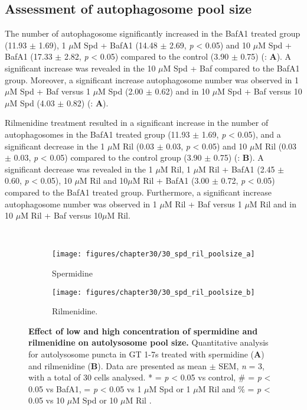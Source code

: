 {\subsection{Assessment of autophagosome pool size}
The number of autophagosome significantly increased in the BafA1 treated group (11.93  $\pm$ 1.69), 1 $\mu$M Spd + BafA1 (14.48 $\pm$ 2.69, \textit{p} < 0.05) and 10 $\mu$M Spd + BafA1 (17.33 $\pm$ 2.82, \textit{p} < 0.05) compared to the control (3.90 $\pm$ 0.75) (: \textbf{A}). A significant increase was revealed in the 10 $\mu$M Spd + Baf compared to the BafA1 group. Moreover, a significant increase autophagosome number was observed in 1 $\mu$M Spd + Baf versus 1 $\mu$M Spd (2.00 $\pm$ 0.62) and in 10 $\mu$M Spd + Baf versus 10 $\mu$M Spd (4.03 $\pm$ 0.82) (: \textbf{A}).

Rilmenidine treatment resulted in a significant increase in the number of autophagosomes in the BafA1 treated group (11.93 $\pm$ 1.69, \textit{p} < 0.05), and a significant decrease in the 1 $\mu$M Ril (0.03 $\pm$ 0.03, \textit{p} < 0.05) and 10 $\mu$M Ril (0.03 $\pm$ 0.03, \textit{p} < 0.05) compared to the control group (3.90 $\pm$ 0.75) (: \textbf{B}). A significant decrease was revealed in the 1 $\mu$M Ril, 1 $\mu$M Ril + BafA1 (2.45 $\pm$ 0.60, \textit{p} < 0.05), 10 $\mu$M Ril and 10$\mu$M Ril + BafA1 (3.00 $\pm$ 0.72, \textit{p} < 0.05) compared to the BafA1 treated group. Furthermore, a significant increase autophagosome number was observed in 1 $\mu$M Ril + Baf versus 1 $\mu$M Ril and in 10 $\mu$M Ril + Baf versus 10$\mu$M Ril.

\
\begin{figure}[!htbp]
  \begin{subfigure}[b]{0.495\linewidth}
    \texttt{[image: figures/chapter30/30\_spd\_ril\_poolsize\_a]}
    \caption{Spermidine}
  \end{subfigure}
  \begin{subfigure}[b]{0.495\linewidth}
    \texttt{[image: figures/chapter30/30\_spd\_ril\_poolsize\_b]}
    \caption{Rilmenidine.}
  \end{subfigure}
  \caption[Effect of a low and high concentration of spermidine and rilmenidine on autolysosome pool size]{\textbf{Effect of low and high concentration of spermidine and rilmenidine on autolysosome pool size.} Quantitative analysis for autolysosome puncta in GT 1-7s treated with spermidine (\textbf{A}) and rilmenidine (\textbf{B}). Data are presented as mean $\pm$ SEM, \textit{n} = 3, with a total of 30 cells analysed. * = \textit{p} < 0.05 vs control, \# = \textit{p} < 0.05 vs BafA1, \@ = \textit{p} < 0.05 vs 1 $\mu$M Spd or 1 $\mu$M Ril and \% = \textit{p} < 0.05 vs 10 $\mu$M Spd or 10 $\mu$M Ril .}
  \label{fig:30_spd_ril_poolsize1}
\end{figure}

}
